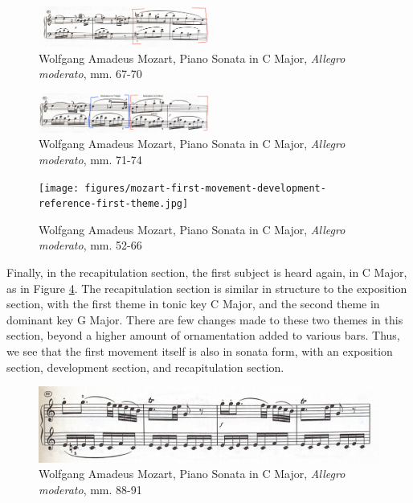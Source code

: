 \begin{figure}[h]
    \centering
    \includegraphics[width=0.5\textwidth]{figures/mozart-first-movement-modulation-a-major.jpg}
    \caption{Wolfgang Amadeus Mozart, Piano Sonata in C Major, \textit{Allegro moderato}, mm. 67-70}
    \label{fig:mozart-first-movement-modulation-a-major}
\end{figure}

\begin{figure}[h]
    \centering
\includegraphics[width=0.5\textwidth]{figures/mozart-first-movement-f-major-d-minor.jpg}
    \caption{Wolfgang Amadeus Mozart, Piano Sonata in C Major, \textit{Allegro moderato}, mm. 71-74}
    \label{fig:mozart-first-movement-f-major-d-minor}
\end{figure}

\begin{figure}[h]
    \centering
    \texttt{[image: figures/mozart-first-movement-development-reference-first-theme.jpg]}
    \caption{Wolfgang Amadeus Mozart, Piano Sonata in C Major, \textit{Allegro moderato}, mm. 52-66}
    \label{fig:mozart-first-movement-development-reference-first-theme}
\end{figure}

Finally, in the recapitulation section, the first subject is heard again, in C Major, as in Figure \ref{fig:mozart-first-movement-recapitulation-first-theme}\autocite{Henle_1977}. The recapitulation section is similar in structure to the exposition section, with the first theme in tonic key C Major, and the second theme in dominant key G Major. There are few changes made to these two themes in this section, beyond a higher amount of ornamentation added to various bars. Thus, we see that the first movement itself is also in sonata form, with an exposition section, development section, and recapitulation section.

\begin{figure}[h]
    \centering
    \includegraphics[width=\textwidth]{figures/mozart-first-movement-recapitulation-first-theme.jpg}
    \caption{Wolfgang Amadeus Mozart, Piano Sonata in C Major, \textit{Allegro moderato}, mm. 88-91}
    \label{fig:mozart-first-movement-recapitulation-first-theme}
\end{figure}

